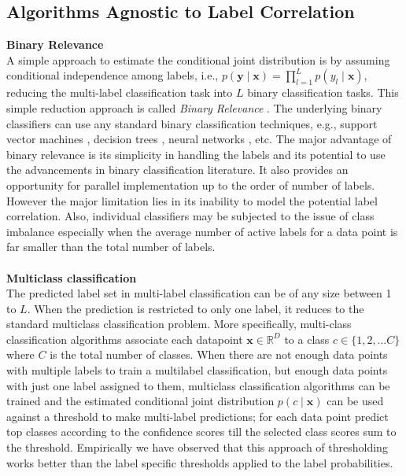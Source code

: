 \subsection{Algorithms Agnostic to Label Correlation}
\textbf{Binary Relevance}\\
A simple approach to estimate the conditional joint distribution is by assuming conditional independence among labels, i.e., $p(\textbf{y}\mid \textbf{x}) = \prod_{l=1}^{L} p(y_l \mid \textbf{x})$, reducing the multi-label classification task into $L$ binary classification tasks. This simple reduction approach is called \textit{Binary Relevance} \cite{tsoumakas2006multi}. The underlying binary classifiers can use any standard binary classification techniques, e.g., support vector machines \cite{cortes1995support}, decision trees \cite{freund1996experiments}, neural networks \cite{lecun2015deep}, etc. The major advantage of binary relevance is its simplicity in handling the labels and its potential to use the advancements in binary classification literature. It also provides an opportunity for parallel implementation up to the order of number of labels. However the major limitation lies in its inability to model the potential label correlation. Also, individual classifiers may be subjected to the issue of class imbalance especially when the average number of active labels for a data point is far smaller than the total number of labels.
\\\\
\textbf{Multiclass classification}\\
The predicted label set in multi-label classification can be of any size between 1 to $L$. When the prediction is restricted to only one label, it reduces to the standard multiclass classification problem. More specifically, multi-class classification algorithms associate each datapoint ${\textbf{x} \in \mathbb{R}^{D}}$ to a class ${c \in \{1,2, \dots C\} }$ where $C$ is the total number of classes. When there are not enough data points with multiple labels to train a multilabel classification, but enough data points with just one label assigned to them, multiclass classification algorithms can be trained and the estimated conditional joint distribution $p(c\mid\textbf{x})$ can be used against a threshold to make multi-label predictions;  for each data point predict top classes according to the confidence scores till the selected class scores sum to the threshold. Empirically we have observed that this approach of thresholding works better than the label specific thresholds applied to the label probabilities.

